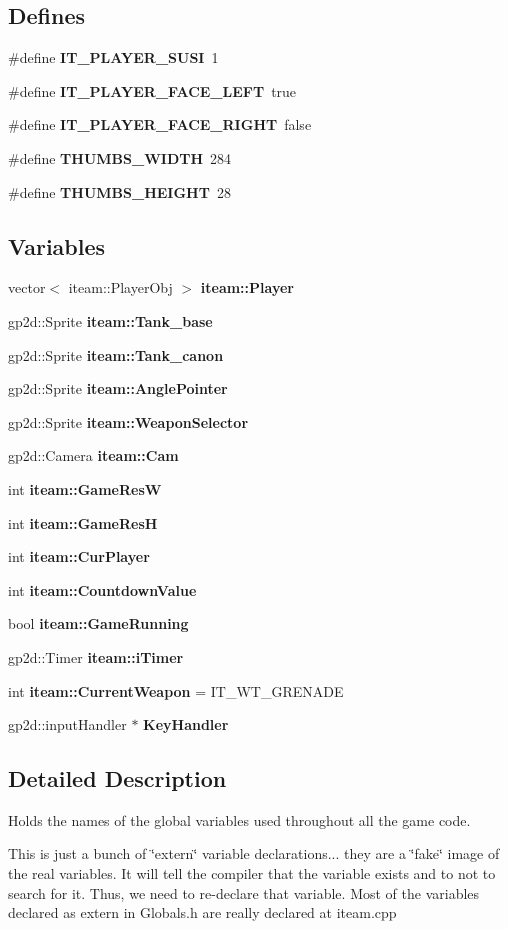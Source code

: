\subsection*{Defines}
\begin{CompactItemize}
\item 
\#define {\bf IT\_\-PLAYER\_\-SUSI}~1
\item 
\#define {\bf IT\_\-PLAYER\_\-FACE\_\-LEFT}~true
\item 
\#define {\bf IT\_\-PLAYER\_\-FACE\_\-RIGHT}~false
\item 
\#define {\bf THUMBS\_\-WIDTH}~284
\item 
\#define {\bf THUMBS\_\-HEIGHT}~28
\end{CompactItemize}
\subsection*{Variables}
\begin{CompactItemize}
\item 
vector$<$ iteam::PlayerObj $>$ {\bf iteam::Player}
\item 
gp2d::Sprite {\bf iteam::Tank\_\-base}
\item 
gp2d::Sprite {\bf iteam::Tank\_\-canon}
\item 
gp2d::Sprite {\bf iteam::AnglePointer}
\item 
gp2d::Sprite {\bf iteam::WeaponSelector}
\item 
gp2d::Camera {\bf iteam::Cam}
\item 
int {\bf iteam::GameResW}
\item 
int {\bf iteam::GameResH}
\item 
int {\bf iteam::CurPlayer}
\item 
int {\bf iteam::CountdownValue}
\item 
bool {\bf iteam::GameRunning}
\item 
gp2d::Timer {\bf iteam::iTimer}
\item 
int {\bf iteam::CurrentWeapon} = IT\_\-WT\_\-GRENADE
\item 
gp2d::inputHandler $\ast$ {\bf KeyHandler}
\end{CompactItemize}


\subsection{Detailed Description}
Holds the names of the global variables used throughout all the game code. 

This is just a bunch of \char`\"{}extern\char`\"{} variable declarations... they are a \char`\"{}fake\char`\"{} image of the real variables. It will tell the compiler that the variable exists and to not to search for it. Thus, we need to re-declare that variable. Most of the variables declared as extern in Globals.h are really declared at iteam.cpp 

